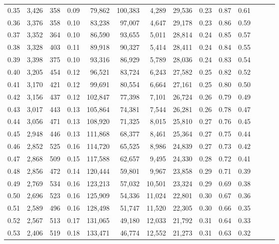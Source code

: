 \begin{tabular}{rrrrrrrrrrrrrr}
0.35 &  3,426 &  358 &  0.09 &   79,862 &  100,383 &   4,289 &  29,536 &  0.23 &  0.87 &      0.61 \\
0.36 &  3,376 &  358 &  0.10 &   83,238 &   97,007 &   4,647 &  29,178 &  0.23 &  0.86 &      0.59 \\
0.37 &  3,352 &  364 &  0.10 &   86,590 &   93,655 &   5,011 &  28,814 &  0.24 &  0.85 &      0.57 \\
0.38 &  3,328 &  403 &  0.11 &   89,918 &   90,327 &   5,414 &  28,411 &  0.24 &  0.84 &      0.55 \\
0.39 &  3,398 &  375 &  0.10 &   93,316 &   86,929 &   5,789 &  28,036 &  0.24 &  0.83 &      0.54 \\
0.40 &  3,205 &  454 &  0.12 &   96,521 &   83,724 &   6,243 &  27,582 &  0.25 &  0.82 &      0.52 \\
0.41 &  3,170 &  421 &  0.12 &   99,691 &   80,554 &   6,664 &  27,161 &  0.25 &  0.80 &      0.50 \\
0.42 &  3,156 &  437 &  0.12 &  102,847 &   77,398 &   7,101 &  26,724 &  0.26 &  0.79 &      0.49 \\
0.43 &  3,017 &  443 &  0.13 &  105,864 &   74,381 &   7,544 &  26,281 &  0.26 &  0.78 &      0.47 \\
0.44 &  3,056 &  471 &  0.13 &  108,920 &   71,325 &   8,015 &  25,810 &  0.27 &  0.76 &      0.45 \\
0.45 &  2,948 &  446 &  0.13 &  111,868 &   68,377 &   8,461 &  25,364 &  0.27 &  0.75 &      0.44 \\
0.46 &  2,852 &  525 &  0.16 &  114,720 &   65,525 &   8,986 &  24,839 &  0.27 &  0.73 &      0.42 \\
0.47 &  2,868 &  509 &  0.15 &  117,588 &   62,657 &   9,495 &  24,330 &  0.28 &  0.72 &      0.41 \\
0.48 &  2,856 &  472 &  0.14 &  120,444 &   59,801 &   9,967 &  23,858 &  0.29 &  0.71 &      0.39 \\
0.49 &  2,769 &  534 &  0.16 &  123,213 &   57,032 &  10,501 &  23,324 &  0.29 &  0.69 &      0.38 \\
0.50 &  2,696 &  523 &  0.16 &  125,909 &   54,336 &  11,024 &  22,801 &  0.30 &  0.67 &      0.36 \\
0.51 &  2,589 &  496 &  0.16 &  128,498 &   51,747 &  11,520 &  22,305 &  0.30 &  0.66 &      0.35 \\
0.52 &  2,567 &  513 &  0.17 &  131,065 &   49,180 &  12,033 &  21,792 &  0.31 &  0.64 &      0.33 \\
0.53 &  2,406 &  519 &  0.18 &  133,471 &   46,774 &  12,552 &  21,273 &  0.31 &  0.63 &      0.32 \\

\end{tabular}
